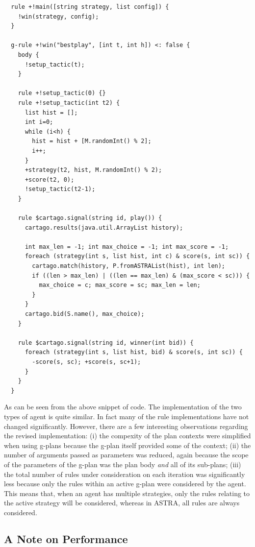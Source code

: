 {\footnotesize
\begin{verbatim}
  rule +!main([string strategy, list config]) {
    !win(strategy, config);
  }
  
  g-rule +!win("bestplay", [int t, int h]) <: false {
    body {
      !setup_tactic(t);
    }

    rule +!setup_tactic(0) {}
    rule +!setup_tactic(int t2) {
      list hist = [];
      int i=0;
      while (i<h) {
        hist = hist + [M.randomInt() % 2];
        i++;
      }
      +strategy(t2, hist, M.randomInt() % 2);
      +score(t2, 0);
      !setup_tactic(t2-1);
    }

    rule $cartago.signal(string id, play()) {
      cartago.results(java.util.ArrayList history);
			
      int max_len = -1; int max_choice = -1; int max_score = -1;
      foreach (strategy(int s, list hist, int c) & score(s, int sc)) {
        cartago.match(history, P.fromASTRAList(hist), int len);
        if ((len > max_len) | ((len == max_len) & (max_score < sc))) {
          max_choice = c; max_score = sc; max_len = len;
        }
      }		
      cartago.bid(S.name(), max_choice);
    }
		
    rule $cartago.signal(string id, winner(int bid)) {
      foreach (strategy(int s, list hist, bid) & score(s, int sc)) {
        -score(s, sc); +score(s, sc+1);
      }
    }
  }
\end{verbatim}}

As can be seen from the above snippet of code. The implementation of the two types of agent
is quite similar. In fact many of the rule implementations have not changed significantly.
However, there are a few interesting observations regarding the revised implementation: (i) the 
compexity of the plan contexts were simplified when using g-plans because the g-plan itself 
provided some of the context; (ii) the number of arguments passed as parameters was reduced, 
again because the scope of the parameters of the g-plan was the plan body \emph{and} all of 
its sub-plans; (iii) the total number of rules under consideration on each iteration was
significantly less because only the rules within an active g-plan were considered by the
agent. This means that, when an agent has multiple strategies, only the rules relating to
the active strategy will be considered, whereas in ASTRA, all rules are always considered.

\subsection{A Note on Performance}
\label{performance}

